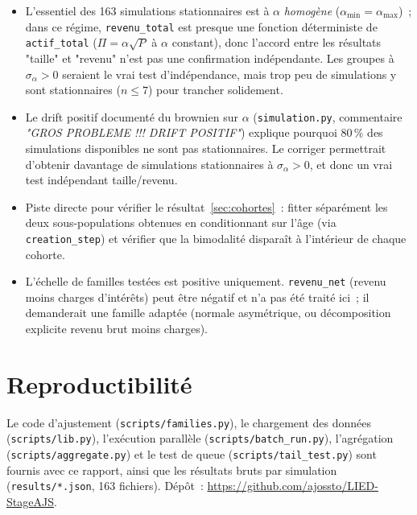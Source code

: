 \documentclass[11pt,a4paper]{article}
\newcommand{\modelrepo}{https://github.com/ajossto/LIED-StageAJS}
\begin{document}
\begin{itemize}
  \item L'essentiel des 163 simulations stationnaires est à $\alpha$
  \emph{homogène} ($\alpha_{\min}=\alpha_{\max}$)~; dans ce régime,
  \texttt{revenu\_total} est presque une fonction déterministe de
  \texttt{actif\_total} ($\Pi=\alpha\sqrt{P}$ à $\alpha$ constant), donc
  l'accord entre les résultats "taille" et "revenu" n'est pas une
  confirmation indépendante. Les groupes à $\sigma_\alpha>0$ seraient le
  vrai test d'indépendance, mais trop peu de simulations y sont
  stationnaires ($n\le 7$) pour trancher solidement.
  \item Le drift positif documenté du brownien sur $\alpha$
  (\texttt{simulation.py}, commentaire \textit{"GROS PROBLEME !!! DRIFT
  POSITIF"}) explique pourquoi 80\,\% des simulations disponibles ne sont
  pas stationnaires. Le corriger permettrait d'obtenir davantage de
  simulations stationnaires à $\sigma_\alpha>0$, et donc un vrai test
  indépendant taille/revenu.
  \item Piste directe pour vérifier le résultat~\ref{sec:cohortes}~: fitter
  séparément les deux sous-populations obtenues en conditionnant sur
  l'âge (via \texttt{creation\_step}) et vérifier que la bimodalité
  disparaît à l'intérieur de chaque cohorte.
  \item L'échelle de familles testées est positive uniquement.
  \texttt{revenu\_net} (revenu moins charges d'intérêts) peut être
  négatif et n'a pas été traité ici~; il demanderait une famille adaptée
  (normale asymétrique, ou décomposition explicite revenu brut moins
  charges).
\end{itemize}

\section*{Reproductibilité}

Le code d'ajustement (\texttt{scripts/families.py}), le chargement des
données (\texttt{scripts/lib.py}), l'exécution parallèle
(\texttt{scripts/batch\_run.py}), l'agrégation
(\texttt{scripts/aggregate.py}) et le test de queue
(\texttt{scripts/tail\_test.py}) sont fournis avec ce rapport, ainsi que
les résultats bruts par simulation (\texttt{results/*.json}, 163
fichiers). Dépôt~: \url{\modelrepo}.
\end{document}
